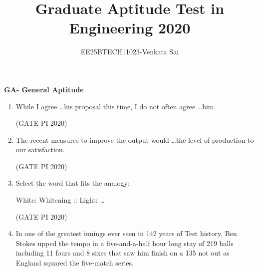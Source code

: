 \documentclass[journal,12pt,onecolumn]{IEEEtran}
\title{Graduate Aptitude Test in Engineering 2020}
\author{EE25BTECH11023-Venkata Sai}
\theoremstyle{remark}
\begin{document}
\noindent
\maketitle

\textbf{GA- General Aptitude}
\begin{enumerate}

\item While I agree \dots his proposal this time, I do not often agree \dots him.
\begin{enumerate}
\end{enumerate}

\hfill (GATE PI 2020)

\item The recent measures to improve the output would \dots the level of production to our satisfaction.
\begin{enumerate}
\end{enumerate}

\hfill (GATE PI 2020)

\item Select the word that fits the analogy:

White: Whitening :: Light: \dots

\begin{enumerate}
\end{enumerate}

\hfill (GATE PI 2020)

\item
In one of the greatest innings ever seen in 142 years of Test history, Ben Stokes upped the tempo in a five-and-a-half hour long stay of 219 balls including 11 fours and 8 sixes that saw him finish on a 135 not out as England squared the five-match series.


\end{enumerate}
\end{document}
